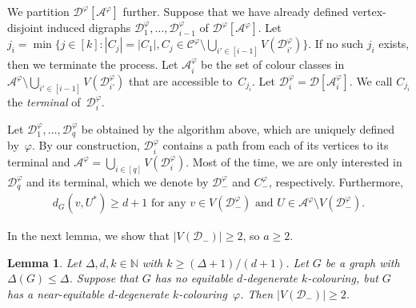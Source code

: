 \documentclass[11pt]{article}
\theoremstyle{plain}
\newtheorem{lem}[thm]{Lemma}
\numberwithin{equation}{section}
\begin{document}
We partition $\mathcal{D}^\varphi[\mathcal{A}^\varphi]$ further.
Suppose that we have already defined vertex-disjoint induced digraphs $\mathcal{D}_1^\varphi, \ldots, \mathcal{D}_{i-1}^\varphi$ of $\mathcal{D}^\varphi[\mathcal{A}^\varphi]$.
Let $j_i=\min\{j\in [k] \colon |C_j| = |C_1|,C_j\in \mathcal{C}^\varphi \setminus \bigcup_{i' \in [i-1]} V(\mathcal{D}_{i'}^\varphi)\} $.
If no such  $j_i$ exists, then we terminate the process.
Let $\mathcal{A}_i^\varphi$ be the set of colour classes in $\mathcal{A}^\varphi \setminus \bigcup_{i' \in [i-1]} V(\mathcal{D}_{i'}^\varphi )$ that are accessible to~$C_{j_i}$.
Let $\mathcal{D}_i^\varphi = \mathcal{D} [\mathcal{A}_i^\varphi]$.
We call $C_{j_i}$ the \emph{terminal} of~$\mathcal{D}_i^\varphi$.


Let $\mathcal{D}_1^\varphi, \ldots, \mathcal{D}_q^\varphi$ be obtained by the algorithm above, which are uniquely defined by~$\varphi$.
By our construction, $\mathcal{D}_i^\varphi$ contains a path from each of its vertices to its terminal  and $\mathcal{A} ^\varphi= \bigcup_{i \in [q]} V(\mathcal{D}_i^\varphi)$.
Most of the time, we are only interested in $\mathcal{D}_q^\varphi$ and its terminal, which we denote by $\mathcal{D}_-^\varphi$ and $C_-^\varphi$, respectively.
Furthermore,
\begin{align}\label{eq:non-accessible}
d_G(v, U^*) \ge d+1 \text{ for any $v\in  V(\mathcal{D}_-^\varphi)$ and $U \in \mathcal{A}^\varphi \setminus V(\mathcal{D}_-^\varphi)$}.
\end{align}

In the next lemma, we show that $|V(\mathcal{D}_-)|\ge 2$, so $a \ge 2$.

\begin{lem}\label{lem:a-lower-bound2}
Let $\Delta, d,k\in \mathbb{N}$ with $k \ge (\Delta+1)/(d+1)$.
Let $G$ be a graph with $\Delta(G)\le \Delta$.
Suppose that $G$ has no equitable $d$-degenerate $k$-colouring, but $G$ has a near-equitable $d$-degenerate $k$-colouring~$\varphi$.
Then $|V(\mathcal{D}_-)|\ge 2$.
\end{lem}
\end{document}
